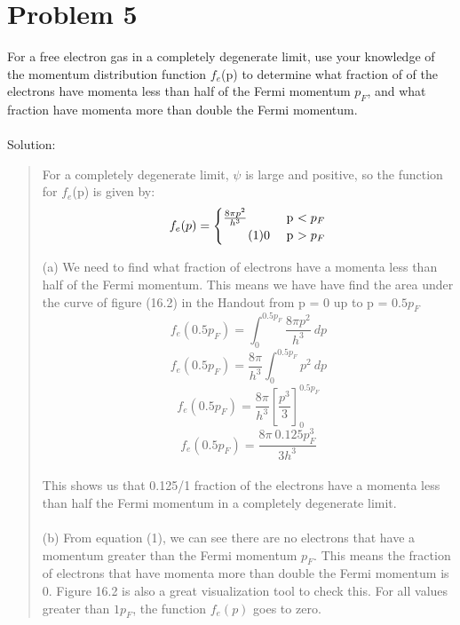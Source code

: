 \documentclass[10pt]{article}
\begin{document}
\section*{Problem 5}
For a free electron gas in a completely degenerate limit, use your knowledge of the momentum distribution function $f_{e}$(p) to determine what fraction of of the electrons have momenta less than half of the Fermi momentum $p_{F}$, and what fraction have momenta more than double the Fermi momentum.\\ \\
Solution:\\
\setlength{\parindent}{1cm}
\begin{quote}
    For a completely degenerate limit, $\psi$ is large and positive, so the function for $f_{e}$(p) is given by:
    \begin{equation}
        f_{e}(p) =
        \begin{cases}
            \frac{8\pi p^{2}}{h^3} & \text{ p $ < p_{F}$}\\  \tag{1}
            0 & \text{ p $ > p_{F}$}
        \end{cases}
    \end{equation}

    (a) We need to find what fraction of electrons have a momenta less than half of the Fermi momentum. This means we have have find the area under the curve of figure (16.2) in the Handout from p = 0 up to p = $0.5 p_{F}$
    \[ f_{e}(0.5 p_{F}) = \int_{0}^{0.5 p_{F}} \frac{8 \pi p^2}{h^3}\ dp\]
    \[ f_{e}(0.5 p_{F}) = \frac{8 \pi}{h^3} \int_{0}^{0.5 p_{F}} p^2 \ dp\]
    \[ f_{e}(0.5 p_{F}) = \frac{8 \pi}{h^3} \left[ \frac{p^3}{3} \right]_{0}^{0.5 p_{F}}\]
    \[ f_{e}(0.5 p_{F}) = \frac{8 \pi\ 0.125 p_{F}^{3}}{3h^3}\]
    \\
    This shows us that 0.125/1 fraction of the electrons have a momenta less than half the Fermi momentum in a completely degenerate limit.\\ \\
    (b) From equation (1), we can see there are no electrons that have a momentum greater than the Fermi momentum $p_{F}$. This means the fraction of electrons that have momenta more than double the Fermi momentum is 0. Figure 16.2 is also a great visualization tool to check this. For all values greater than $1 p_{F}$, the function $f_{e}(p)$ goes to zero.
\end{quote}
\end{document}
